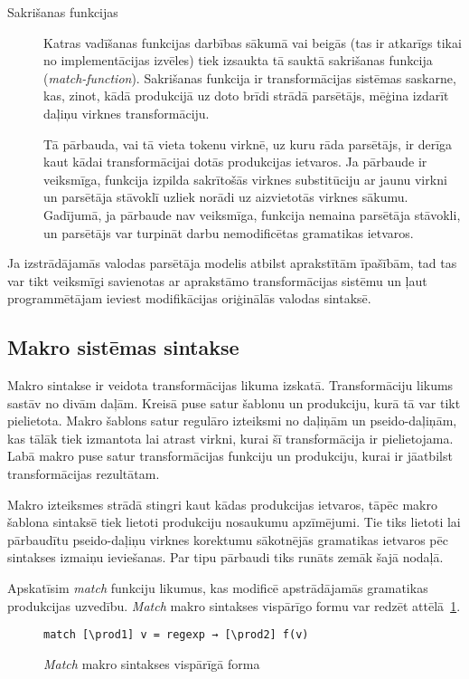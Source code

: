 \begin{description}
\item[Sakrišanas funkcijas]
Katras vadīšanas funkcijas darbības sākumā vai beigās (tas ir atkarīgs tikai no implementācijas izvēles) tiek izsaukta tā sauktā sakrišanas funkcija (\emph{match-function}). Sakrišanas funkcija ir transformācijas sistēmas saskarne, kas, zinot, kādā produkcijā uz doto brīdi strādā parsētājs, mēģina izdarīt daļiņu virknes transformāciju.

Tā pārbauda, vai tā vieta tokenu virknē, uz kuru rāda parsētājs, ir derīga kaut kādai transformācijai dotās produkcijas ietvaros. Ja pārbaude ir veiksmīga, funkcija izpilda sakrītošās virknes substitūciju ar jaunu virkni un parsētāja stāvoklī uzliek norādi uz aizvietotās virknes sākumu. Gadījumā,  ja pārbaude nav veiksmīga, funkcija nemaina parsētāja stāvokli, un parsētājs var turpināt darbu nemodificētas gramatikas ietvaros.
\end{description}

Ja izstrādājamās valodas parsētāja modelis atbilst aprakstītām īpašībām, tad tas var tikt veiksmīgi savienotas ar aprakstāmo transformācijas sistēmu un ļaut programmētājam ieviest modifikācijas oriģinālās valodas sintaksē.

\subsection{\label{sbs:sys_macrosyntax}Makro sistēmas sintakse}

Makro sintakse ir veidota transformācijas likuma izskatā. Transformāciju likums sastāv no divām daļām. Kreisā puse satur šablonu un produkciju, kurā tā var tikt pielietota. Makro šablons satur regulāro izteiksmi no daļiņām un pseido-daļiņām, kas tālāk tiek izmantota lai atrast virkni, kurai šī transformācija ir pielietojama. Labā makro puse satur transformācijas funkciju un produkciju, kurai ir jāatbilst transformācijas rezultātam.

Makro izteiksmes strādā stingri kaut kādas produkcijas ietvaros, tāpēc makro šablona sintaksē tiek lietoti produkciju nosaukumu apzīmējumi. Tie tiks lietoti lai pārbaudītu pseido-daļiņu virknes korektumu sākotnējās gramatikas ietvaros pēc sintakses izmaiņu ieviešanas. Par tipu pārbaudi tiks runāts zemāk šajā nodaļā.

Apskatīsim \textit{match} funkciju likumus, kas modificē apstrādājamās gramatikas produkcijas uzvedību. \emph{Match} makro sintakses vispārīgo formu var redzēt attēlā~\ref{fig:matchsyntax}.

\begin{figure}[h!]
\begin{verbatim}
match [\prod1] v = regexp → [\prod2] f(v)
\end{verbatim}
\caption{\label{fig:matchsyntax}\emph{Match} makro sintakses vispārīgā forma}
\end{figure}

